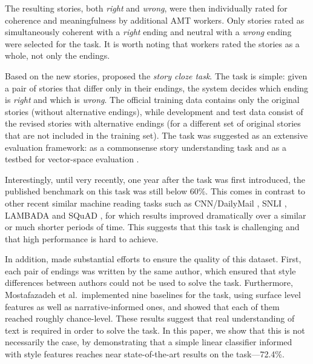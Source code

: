 \documentclass[11pt,a4paper]{article}
\newcommand{\com}[1]{}
\newcommand{\resolved}[1]{}
\newcommand{\roy}[1]{{\color{orange}\textsc{[#1 --rs]}}}
\renewcommand{\roy}[1]{{\color{orange}[#1 --rs]}}
\renewcommand{\roy}[1]{#1}
\begin{document}
The resulting stories, both {\it right} and {\it wrong}, were then individually rated for coherence and meaningfulness by additional AMT workers.
Only stories rated as simultaneously coherent with a {\it right} ending and neutral with a {\it wrong} ending were selected for the task. 
It is worth noting that workers rated the stories as a whole, not only the endings.

Based on the new stories, \citet{Mostafazadeh:2016} proposed the {\it story cloze task}. 
The task is simple:  given a pair of stories that differ only in their endings, the system decides which ending is {\it right} and which is {\it wrong}. 
The official training data contains only the original stories (without alternative endings), while development and test data consist of the revised stories with alternative endings (for a different set of original stories that are not included in the training set).\resolved{\roy{added {\it not} here}}
The task was suggested as an extensive evaluation framework:
as a commonsense story understanding task\com{, 
as the shared task for the  Linking Models of Lexical, Sentential and Discourse-level Semantics workshop (LSDSem 2017),} and as a testbed for vector-space evaluation \cite{mostafazadeh2016story}.

Interestingly, \roy{until very recently, one year after the task was first introduced, the published benchmark on this task was still below 60\%}.
This comes in contrast to other recent similar machine reading tasks such as CNN/DailyMail \cite{hermann2015teaching}, SNLI \cite{bowman2015large}, LAMBADA \cite{Paperno:2016} and SQuAD \cite{rajpurkar2016squad}, for which results improved dramatically over a similar or much shorter periods of time. This suggests that this task is challenging and that high performance is hard to achieve.

In addition, \citet{Mostafazadeh:2016} made substantial efforts to ensure the quality of this dataset. 
First, each pair of endings was written by the same author, which
ensured that style differences between authors could not be used to solve the task. 
Furthermore, Mostafazadeh et al.~implemented nine baselines for the task, using surface level features as well as narrative-informed ones, and showed that each of them reached roughly chance-level.
These results suggest that real understanding of text is required in order to solve the task.
\roy{In this paper, we show that this is not necessarily the case, by demonstrating that a simple linear classifier informed with style features reaches near state-of-the-art results on the task---72.4\%.}
\end{document}
